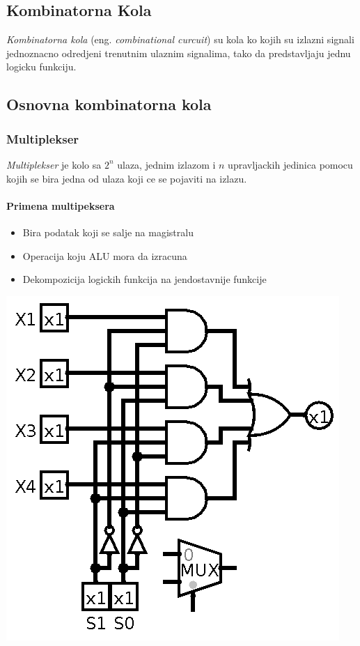 \documentclass[12p,a4paper]{article}
\begin{document}
\begin{multicols}{2}
    \section{Kombinatorna Kola}

    \emph{Kombinatorna kola} (eng. \emph{combinational curcuit}) su kola ko 
    kojih su izlazni signali jednoznacno odredjeni trenutnim ulaznim 
    signalima, tako da predstavljaju jednu logicku funkciju.

    \subsection{Osnovna kombinatorna kola}

    \subsubsection{Multiplekser}

    \emph{Multiplekser} je kolo sa $2^n$ ulaza, jednim izlazom i $n$ 
    upravljackih jedinica pomocu kojih se bira jedna od ulaza koji ce se 
    pojaviti na izlazu.
    
    \paragraph{Primena multipeksera}
    \begin{itemize}
        \itemsep0em
        \item Bira podatak koji se salje na magistralu
        \item Operacija koju ALU mora da izracuna
        \item Dekompozicija logickih funkcija na jendostavnije funkcije
    \end{itemize}
    \includegraphics[width=0.7\columnwidth]{Figures/mux.png}


\end{multicols}
\end{document}
